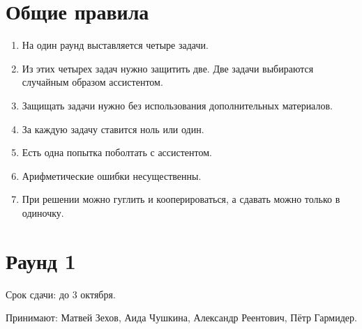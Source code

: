 \documentclass[12pt]{article}
\begin{document}
\section{Общие правила}

\begin{enumerate}
  \item На один раунд выставляется четыре задачи.
  \item Из этих четырех задач нужно защитить две. Две задачи выбираются случайным образом ассистентом.
  \item Защищать задачи нужно без использования дополнительных материалов.
  \item За каждую задачу ставится ноль или один.
  \item Есть одна попытка поболтать с ассистентом.
  \item Арифметические ошибки несущественны.
  \item При решении можно гуглить и кооперироваться, а сдавать можно только в одиночку.
\end{enumerate}

\section{Раунд 1}

Срок сдачи: до 3 октября.

Принимают: Матвей Зехов, Аида Чушкина, Александр Реентович, Пётр Гармидер.
\end{document}
